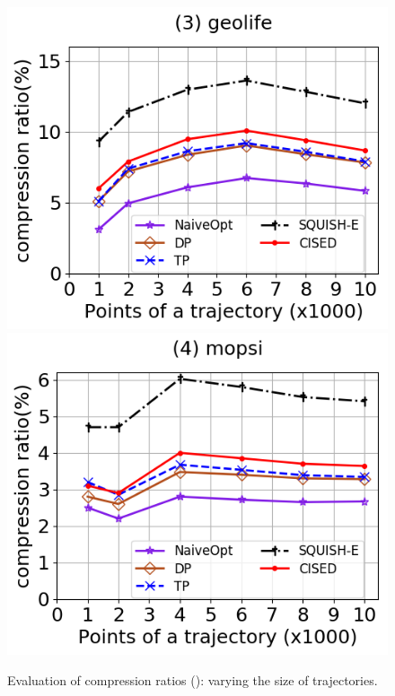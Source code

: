 \begin{figure}[tb!]
	\includegraphics[scale=0.315]{Figures/Exp-SED-CR-size-geolife.png}	\hspace{1ex}
	\includegraphics[scale=0.315]{Figures/Exp-SED-CR-size-mopsi.png}		
	\vspace{-2.5ex}

	\caption{\small Evaluation of compression ratios (\sed): varying the size of
    trajectories.}
  \label{fig:cr-sed-size}
	\vspace{-2ex}
\end{figure}




